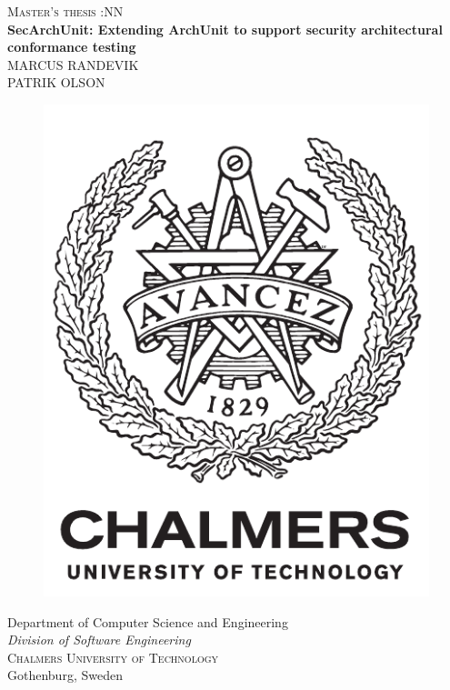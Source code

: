 \newpage
\thispagestyle{empty}
\begin{center}
	\textsc{\large Master's thesis \the\year:NN}\\[4cm]		%
	\textbf{\Large SecArchUnit: Extending ArchUnit to support security architectural conformance testing} \\[1cm]
	{\large MARCUS RANDEVIK}\\
	{\large PATRIK OLSON}
	
	\vfill	
	\begin{figure}[H]
	\centering
	\includegraphics[width=0.2\pdfpagewidth]{figure/auxiliary/logo_eng.pdf} \\	
	\end{figure}	\vspace{5mm}	
	
	Department of Computer Science and Engineering \\
	\emph{Division of Software Engineering}\\
	\textsc{Chalmers University of Technology} \\
	Gothenburg, Sweden \the\year \\
\end{center}


